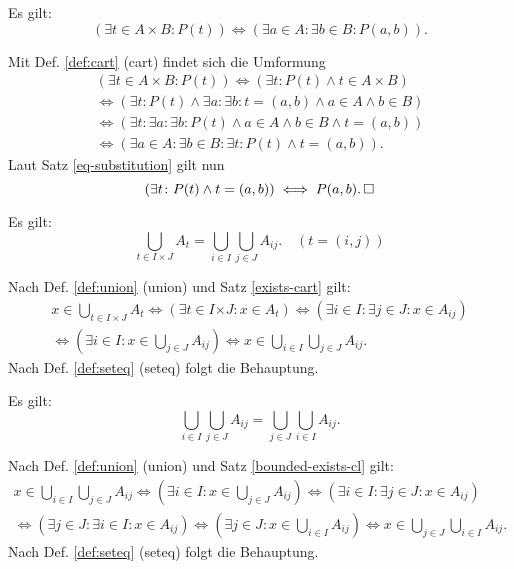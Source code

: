 \begin{Satz}\label{exists-cart}
Es gilt:
\[(\exists t\in A{\times}B\colon P(t))
\iff (\exists a{\in}A\colon \exists b{\in}B\colon P(a,b)).\]
\end{Satz}

\begin{Beweis}
Mit Def. \ref{def:cart} (cart) findet sich die Umformung
\begin{gather*}
(\exists t{\in}A{\times}B\colon P(t))
\iff (\exists t\colon P(t)\land t\in A\times B)\\
\iff (\exists t\colon P(t)\land \exists a\colon\exists b\colon t=(a,b)\land a\in A\land b\in B)\\
\iff (\exists t\colon \exists a\colon \exists b\colon P(t)\land a\in A\land b\in B\land t=(a,b))\\
\iff (\exists a{\in}A\colon \exists b{\in}B\colon \exists t\colon P(t)\land t=(a,b)).
\end{gather*}
Laut Satz \ref{eq-substitution} gilt nun
\[(\exists t\colon P(t)\land t=(a,b))\iff P(a,b).\,\square\]
\end{Beweis}

\begin{Satz}\label{cup-cart}
Es gilt:
\[\bigcup_{t\in I\times J} A_t
= \bigcup_{i\in I}\bigcup_{j\in J} A_{ij}.\quad (t=(i,j))\]
\end{Satz}

\begin{Beweis}
Nach Def. \ref{def:union} (union) und Satz \ref{exists-cart} gilt:
\begin{gather*}
x\in \bigcup_{t\in I\times J} A_t
\iff (\exists t\in I{\times J}\colon x\in A_t)
\iff (\exists i{\in}I\colon\exists j{\in}J\colon x\in A_{ij})\\
\iff (\exists i{\in}I\colon x\in \bigcup_{j\in J} A_{ij})
\iff x\in\bigcup_{i\in I}\bigcup_{j\in J} A_{ij}.
\end{gather*}
Nach Def. \ref{def:seteq} (seteq) folgt die Behauptung.\,\qedsymbol
\end{Beweis}

\begin{Satz}
Es gilt:
\[\bigcup_{i\in I}\bigcup_{j\in J} A_{ij}
= \bigcup_{j\in J}\bigcup_{i\in I} A_{ij}.\]
\end{Satz}

\begin{Beweis}
Nach Def. \ref{def:union} (union) und Satz \ref{bounded-exists-cl} gilt:
\begin{gather*}
x\in\bigcup_{i\in I}\bigcup_{j\in J} A_{ij}
\iff (\exists i{\in}I\colon x\in\bigcup_{j\in J} A_{ij})
\iff (\exists i{\in}I\colon\exists j{\in}J\colon x\in A_{ij})\\
\iff (\exists j{\in}J\colon\exists i{\in}I\colon x\in A_{ij})
\iff (\exists j{\in}J\colon x\in \bigcup_{i\in I}A_{ij})
\iff x\in\bigcup_{j\in J}\bigcup_{i\in I} A_{ij}.
\end{gather*}
Nach Def. \ref{def:seteq} (seteq) folgt die Behauptung.\,\qedsymbol
\end{Beweis}

